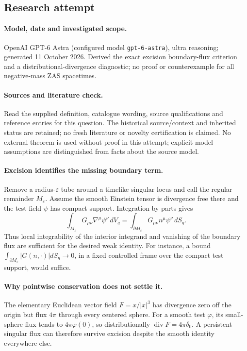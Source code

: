 \documentclass[11pt]{article}
\begin{document}
\subsection{Research attempt}
\paragraph{Model, date and investigated scope.}
OpenAI GPT-6 Astra (configured model \texttt{gpt-6-astra}), ultra reasoning; generated 11 October 2026. Derived the exact excision boundary-flux criterion and a distributional-divergence diagnostic; no proof or counterexample for all negative-mass ZAS spacetimes.

\paragraph{Sources and literature check.}
Read the supplied definition, catalogue wording, source qualifications and reference entries for this question. The historical source/context and inherited status are retained; no fresh literature or novelty certification is claimed. No external theorem is used without proof in this attempt; explicit model assumptions are distinguished from facts about the source model.

\paragraph{Excision identifies the missing boundary term.} Remove a radius-\(\varepsilon\) tube around a timelike singular locus and call the regular remainder \(M_\varepsilon\). Assume the smooth Einstein tensor is divergence free there and the test field \(\psi\) has compact support. Integration by parts gives
\[
 \int_{M_\varepsilon}G_{\mu\nu}\nabla^\mu\psi^\nu\,dV_g
 =\int_{\partial M_\varepsilon}G_{\mu\nu}n^\mu\psi^\nu\,dS_g.
\]
Thus local integrability of the interior integrand and vanishing of the boundary flux are sufficient for the desired weak identity. For instance, a bound \(\int_{\partial M_\varepsilon}|G(n,\cdot)|dS_g\to0\), in a fixed controlled frame over the compact test support, would suffice.
\paragraph{Why pointwise conservation does not settle it.} The elementary Euclidean vector field \(F=x/|x|^3\) has divergence zero off the origin but flux \(4\pi\) through every centered sphere. For a smooth test \(\varphi\), its small-sphere flux tends to \(4\pi\varphi(0)\), so distributionally \(\operatorname{div}F=4\pi\delta_0\). A persistent singular flux can therefore survive excision despite the smooth identity everywhere else.
\end{document}

